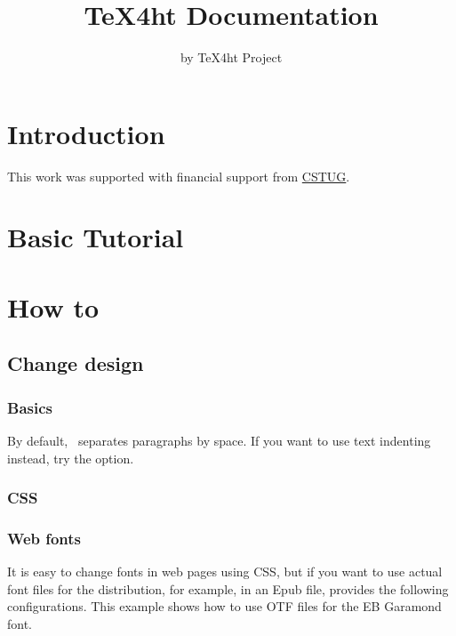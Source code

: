 \documentclass{book}
\title{TeX4ht Documentation}
\author{by TeX4ht Project}
\begin{document}
\maketitle

\ifdefined\HCode\else\tableofcontents\fi


\chapter{Introduction}


\begin{acknowledgements}
This work was supported with financial support from \href{https://cstug.cz/}{CSTUG}.
\end{acknowledgements}

\chapter{Basic Tutorial}

\chapter{How to}

\section{Change design}
\subsection{Basics}

By default, \texfourht\ separates paragraphs by space. If you want to use text indenting instead, try the  option.

\subsection{CSS}
\subsection{Web fonts}

It is easy to change fonts in web pages using CSS, but if you want to use
actual font files for the distribution, for example, in an Epub file, \texfourht
provides the following configurations. This example shows how to use OTF files
for the EB Garamond font. 
\end{document}
